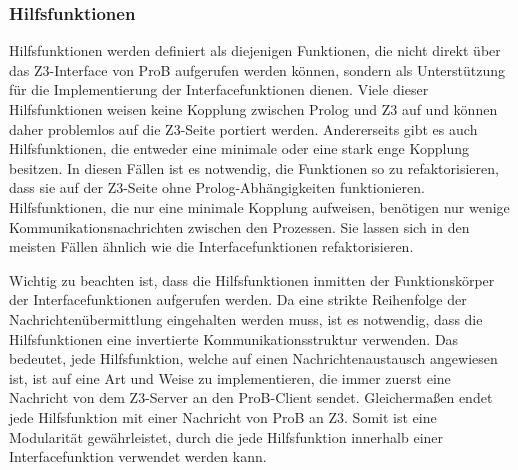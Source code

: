 \subsubsection{Hilfsfunktionen}
\label{subsec:helper-functions}
Hilfsfunktionen werden definiert als diejenigen Funktionen, die nicht direkt über das Z3-Interface von ProB aufgerufen werden können,
sondern als Unterstützung für die Implementierung der Interfacefunktionen dienen.
Viele dieser Hilfsfunktionen weisen keine Kopplung zwischen Prolog und Z3 auf und können daher problemlos auf die Z3-Seite portiert werden.
Andererseits gibt es auch Hilfsfunktionen, die entweder eine minimale oder eine stark enge Kopplung besitzen.
In diesen Fällen ist es notwendig, die Funktionen so zu refaktorisieren, dass sie auf der Z3-Seite ohne Prolog-Abhängigkeiten funktionieren.
Hilfsfunktionen, die nur eine minimale Kopplung aufweisen, benötigen nur wenige Kommunikationsnachrichten zwischen den Prozessen.
Sie lassen sich in den meisten Fällen ähnlich wie die Interfacefunktionen refaktorisieren.

Wichtig zu beachten ist, dass die Hilfsfunktionen inmitten der Funktionskörper der Interfacefunktionen aufgerufen werden.
Da eine strikte Reihenfolge der Nachrichtenübermittlung eingehalten werden muss, ist es notwendig, dass die Hilfsfunktionen
eine invertierte Kommunikationsstruktur verwenden.
Das bedeutet, jede Hilfsfunktion, welche auf einen Nachrichtenaustausch angewiesen ist, ist auf eine Art und Weise zu implementieren,
die immer zuerst eine Nachricht von dem Z3-Server an den ProB-Client sendet.
Gleichermaßen endet jede Hilfsfunktion mit einer Nachricht von ProB an Z3.
Somit ist eine Modularität gewährleistet, durch die jede Hilfsfunktion innerhalb einer Interfacefunktion verwendet werden kann.

